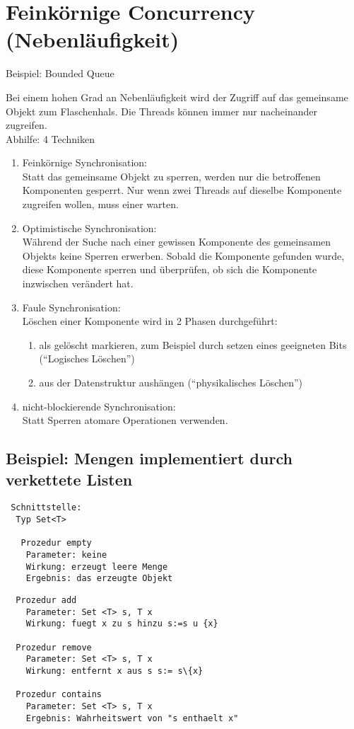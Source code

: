 \documentclass[a4paper,12pt]{scrartcl}
\begin{document}
\section{Feinkörnige Concurrency (Nebenläufigkeit)}
Beispiel: Bounded Queue

Bei einem hohen Grad an Nebenläufigkeit wird der Zugriff auf das gemeinsame Objekt zum Flaschenhals. Die Threads können immer nur nacheinander zugreifen.\\
Abhilfe: 4 Techniken
\begin{enumerate}
 \item Feinkörnige Synchronisation:\\
  Statt das gemeinsame Objekt zu sperren, werden nur die betroffenen Komponenten gesperrt. Nur wenn zwei Threads auf dieselbe Komponente zugreifen wollen, muss einer warten.
 \item Optimistische Synchronisation:\\
  Während der Suche nach einer gewissen Komponente des gemeinsamen Objekts keine Sperren erwerben. Sobald die Komponente gefunden wurde, diese Komponente sperren und überprüfen, ob sich die Komponente inzwischen verändert hat.
 \item Faule Synchronisation:\\
  Löschen einer Komponente wird in 2 Phasen durchgeführt:
  \begin{enumerate}
   \item als gelöscht markieren, zum Beispiel durch setzen eines geeigneten Bits ("`Logisches Löschen"')
   \item aus der Datenstruktur aushängen ("`physikalisches Löschen"')
  \end{enumerate}
 \item nicht-blockierende Synchronisation:\\
 Statt Sperren atomare Operationen verwenden.
\end{enumerate}

\subsection{Beispiel: Mengen implementiert durch verkettete Listen}

\begin{lstlisting}
 Schnittstelle:
  Typ Set<T>
   
   Prozedur empty
    Parameter: keine
    Wirkung: erzeugt leere Menge
    Ergebnis: das erzeugte Objekt
\end{lstlisting}
\begin{lstlisting}
  Prozedur add
    Parameter: Set <T> s, T x
    Wirkung: fuegt x zu s hinzu s:=s u {x}
    
  Prozedur remove
    Parameter: Set <T> s, T x
    Wirkung: entfernt x aus s s:= s\{x}
    
  Prozedur contains
    Parameter: Set <T> s, T x
    Ergebnis: Wahrheitswert von "s enthaelt x"
\end{lstlisting}
\end{document}
